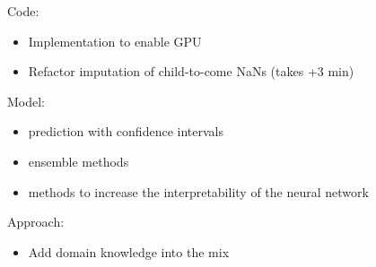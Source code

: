 \documentclass[11pt]{article}
\theoremstyle{definition}
\begin{document}
    Code:
    \begin{itemize}
        \item Implementation to enable GPU
        \item Refactor imputation of child-to-come NaNs (takes +3 min)
    \end{itemize}

    Model:
    \begin{itemize}
        \item prediction with confidence intervals
        \item ensemble methods
        \item methods to increase the interpretability of the neural network
    \end{itemize}
    
    Approach:
    \begin{itemize}
        \item Add domain knowledge into the mix
    \end{itemize}

  
\end{document}
